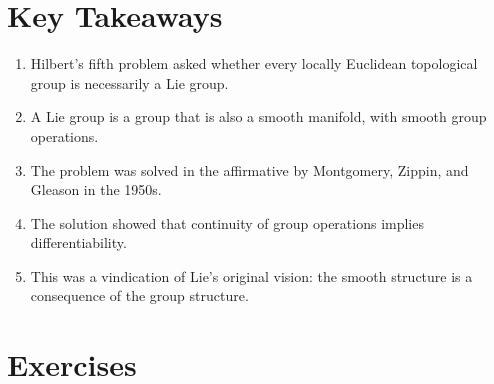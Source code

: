 \section*{Key Takeaways}

\begin{enumerate}
    \item Hilbert's fifth problem asked whether every locally Euclidean topological group is necessarily a Lie group.
    \item A Lie group is a group that is also a smooth manifold, with smooth group operations.
    \item The problem was solved in the affirmative by Montgomery, Zippin, and Gleason in the 1950s.
    \item The solution showed that continuity of group operations implies differentiability.
    \item This was a vindication of Lie's original vision: the smooth structure is a consequence of the group structure.
\end{enumerate}

\section*{Exercises}

